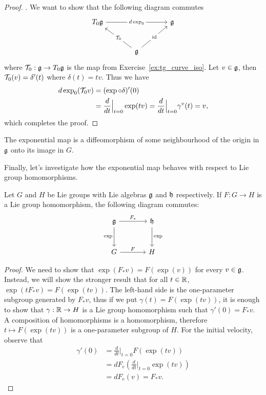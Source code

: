 \begin{proof}
	. We want to show that the following diagram commutes
	\begin{equation}\nonumber
		\begin{tikzcd}[row sep=large, column sep=large]
			T_0\fg \arrow[rr, "d\exp_0" description] & & \fg \\
			& \fg \arrow[ul, "\cT_0" description] \arrow[ur, "\id" description] &
		\end{tikzcd}
	\end{equation}
	where $\mathcal{T}_0:\mathfrak{g}\to T_0\mathfrak{g}$ is the map from Exercise~\ref{ex:tg_curve_iso}.
	Let $v\in\mathfrak{g}$, then $\mathcal{T}_0(v) = \delta'(t)$ where $\delta(t) = tv$.
	Thus we have
	\begin{align}
		d\exp_0 (\mathcal{T}_0 v) & = (\exp \circ \delta)'(0)          \\
		                  & = \frac{d}{dt}\Big|_{t=0} \exp(tv)
		= \frac{d}{dt}\Big|_{t=0} \gamma^v(t)
		= v,
	\end{align}
	which completes the proof.
\end{proof}
\begin{corollary}
	The exponential map is a diffeomorphism of some neighbourhood of the origin in $\mathfrak{g}$ onto its image in $G$.
\end{corollary}

Finally, let's investigate how the exponential map behaves with respect to Lie group homomorphisms.

\begin{proposition}
	Let $G$ and $H$ be Lie groups with Lie algebras $\mathfrak{g}$ and $\mathfrak{h}$ respectively.
	If $F:G\to H$ is a Lie group homomorphism, the following diagram commutes:
	\begin{equation}\nonumber
		\begin{tikzcd}[row sep=large, column sep=large]
			\fg \arrow[r, "F_*"] \arrow[d, "\exp" left] & \fh \arrow[d, "\exp"] \\
			G \arrow[r, "F"] & H
		\end{tikzcd}
	\end{equation}
\end{proposition}
\begin{proof}
	We need to show that $\exp(F_*v) = F(\exp(v))$ for every $v\in \mathfrak{g}$.
	Instead, we will show the stronger result that for all $t\in\mathbb{R}$, $\exp(t F_*v) = F(\exp(tv))$.
	The left-hand side is the one-parameter subgroup generated by $F_* v$, thus if we put $\gamma(t) = F(\exp(tv))$, it is enough to show that $\gamma:\mathbb{R}\to H$ is a Lie group homomorphism such that $\gamma'(0) = F_*v$.
	A composition of homomorphisms is a homomorphism, therefore $t\mapsto F(\exp(tv))$ is a one-parameter subgroup of $H$.
	For the initial velocity, observe that
	\begin{align}
		\gamma'(0) & = \frac{d}{dt}\Big|_{t=0} F(\exp(tv))               \\
		                 & = dF_e\left(\frac{d}{dt}\Big|_{t=0} \exp(tv) \right) \\
		                 & = dF_e(v) = F_*v.
	\end{align}
\end{proof}

